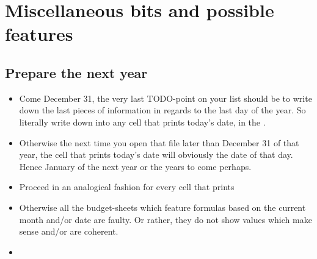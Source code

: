 \section{Miscellaneous bits and possible features}
\label{section:Miscellaneous_bits_and_possible_features}

\subsection{Prepare the next year}
\label{sec:PreparationNextYear}

\begin{itemize}
	\item Come December 31, the very last TODO-point on your list should be to write down the last pieces of information in regards to the last day of the year.
	So literally write down  into any cell that prints today's date, \eg in the \sheetnameBudget.
	\item Otherwise the next time you open that file later than December 31 of that year, the cell that prints today's date will obviously the date of that day.
	Hence January of the next year or the years to come perhaps.
	\item Proceed in an analogical fashion for every cell that prints 
	\item Otherwise all the budget-sheets which feature formulas based on the current month and/or date are faulty. Or rather, they do not show values which make sense and/or are coherent.
	\item 
\end{itemize}

